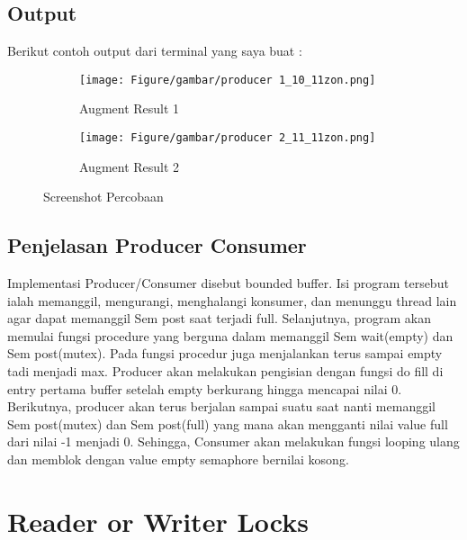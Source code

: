 \documentclass[11pt,a4paper]{article}
\begin{document}
\newpage   
\subsection{\textbf{Output}}
    Berikut contoh output dari terminal yang saya buat :
    
\begin{figure}[h]
	\centering
	\begin{subfigure}[b]{0.4\textwidth}
		\centering
		\def\svgwidth{\columnwidth}
		\texttt{[image: Figure/gambar/producer 1\_10\_11zon.png]}
		\caption{Augment Result 1}
		\label{fig:aug-1}
	\end{subfigure}
	\qquad %
	\begin{subfigure}[b]{0.4\textwidth}
		\centering
		\def\svgwidth{\columnwidth}
		\texttt{[image: Figure/gambar/producer 2\_11\_11zon.png]}
		\caption{Augment Result 2}
		\label{fig:aug-2}
	\end{subfigure}
	\caption{Screenshot Percobaan}\label{fig:aug}
\end{figure}

\subsection{\textbf{Penjelasan Producer Consumer}}
Implementasi Producer/Consumer disebut bounded buffer. Isi program tersebut ialah memanggil, mengurangi, menghalangi konsumer, dan menunggu thread lain agar dapat memanggil
Sem post saat terjadi full. Selanjutnya, program akan memulai fungsi procedure yang berguna dalam memanggil Sem wait(empty) dan Sem post(mutex). Pada fungsi procedur juga menjalankan terus sampai empty tadi menjadi max. Producer akan melakukan pengisian dengan fungsi do fill di entry pertama buffer setelah empty berkurang hingga mencapai nilai 0. Berikutnya, producer akan terus berjalan sampai suatu saat nanti memanggil Sem post(mutex) dan Sem post(full) yang mana akan mengganti nilai value full dari nilai -1 menjadi 0. Sehingga, Consumer akan melakukan fungsi looping ulang dan memblok dengan value empty semaphore
bernilai kosong.

\section{\textbf{Reader or Writer Locks}}
\end{document}
